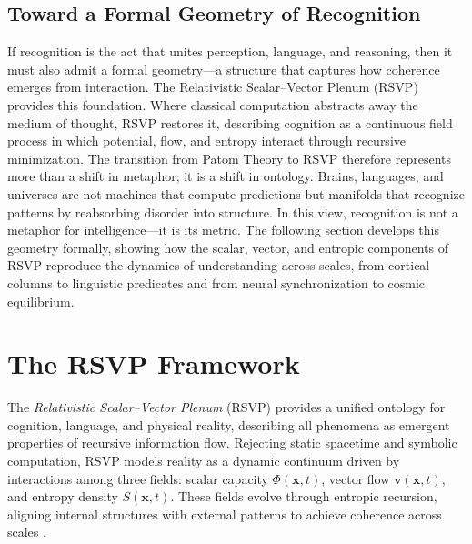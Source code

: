 \documentclass[11pt]{article}
\begin{document}
\subsection{Toward a Formal Geometry of Recognition}

If recognition is the act that unites perception, language, and reasoning,
then it must also admit a formal geometry—a structure that captures how
coherence emerges from interaction.  
The Relativistic Scalar–Vector Plenum (RSVP) provides this foundation.
Where classical computation abstracts away the medium of thought,
RSVP restores it, describing cognition as a continuous field process in
which potential, flow, and entropy interact through recursive minimization.
The transition from Patom Theory to RSVP therefore represents more than a
shift in metaphor; it is a shift in ontology.
Brains, languages, and universes are not machines that compute predictions
but manifolds that recognize patterns by reabsorbing disorder into structure.
In this view, recognition is not a metaphor for intelligence—it is its metric.
The following section develops this geometry formally, showing how the
scalar, vector, and entropic components of RSVP reproduce the dynamics of
understanding across scales, from cortical columns to linguistic predicates
and from neural synchronization to cosmic equilibrium.


\section{The RSVP Framework}
\label{sec:rsvp}
The \textit{Relativistic Scalar--Vector Plenum} (RSVP) provides a unified ontology for cognition, language, and physical reality, describing all phenomena as emergent properties of recursive information flow. Rejecting static spacetime and symbolic computation, RSVP models reality as a dynamic continuum driven by interactions among three fields: scalar capacity $\Phi(\mathbf{x},t)$, vector flow $\mathbf{v}(\mathbf{x},t)$, and entropy density $S(\mathbf{x},t)$. These fields evolve through entropic recursion, aligning internal structures with external patterns to achieve coherence across scales \citep{leibniz1714monadology, saussure1916course}.
\end{document}
